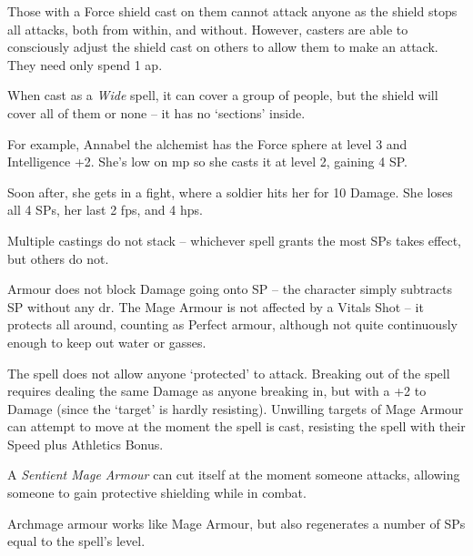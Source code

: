 \begin{multicols}{2}
Those with a Force shield cast on them cannot attack anyone as the shield stops all attacks, both from within, and without.
However, casters are able to consciously adjust the shield cast on others to allow them to make an attack.
They need only spend 1 \gls{ap}.

When cast as a \textit{Wide} spell, it can cover a group of people, but the shield will cover all of them or none -- it has no `sections' inside.

\begin{exampletext}
  For example, Annabel the alchemist has the Force sphere at level 3 and Intelligence +2.
  She's low on \gls{mp} so she casts it at level 2, gaining 4 \gls{SP}.
  
  Soon after, she gets in a fight, where a soldier hits her for 10 Damage.
  She loses all 4 \glspl{SP}, her last 2 \glspl{fp}, and 4 \glspl{hp}.
\end{exampletext}

Multiple castings do not stack -- whichever spell grants the most \glspl{SP} takes effect, but others do not.

Armour does not block Damage going onto \gls{SP} -- the character simply subtracts \gls{SP} without any \gls{dr}.
The Mage Armour is not affected by a Vitals Shot -- it protects all around, counting as Perfect armour, although not quite continuously enough to keep out water or gasses.

The spell does not allow anyone `protected' to attack.
Breaking out of the spell requires dealing the same Damage as anyone breaking in, but with a +2 to Damage (since the `target' is hardly resisting).
Unwilling targets of Mage Armour can attempt to move at the moment the spell is cast, resisting the spell with their Speed plus Athletics Bonus.

A \textit{Sentient Mage Armour} can cut itself at the moment someone attacks, allowing someone to gain protective shielding while in combat.

\spelllevel


Archmage armour works like Mage Armour, but also regenerates a number of \glspl{SP} equal to the spell's level.

\end{multicols}


